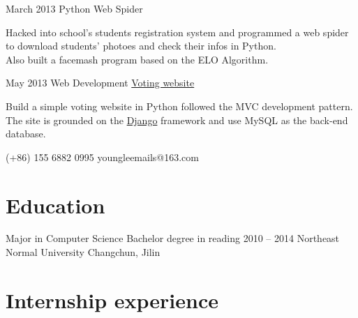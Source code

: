 \documentclass{tccv}
\begin{document}
\begin{eventlist}
\item{March 2013}
  {}
  {Python Web Spider}

  Hacked into school's students registration system
  and programmed a web spider to download students' photoes and check their infos in Python. \\ 
  Also built a facemash program based on the ELO Algorithm.


\item{May 2013}
  {Web Development}
  {\href{https://github.com/YoungLeeNENU/a-vote-website}{Voting website}}

  Build a simple voting website in Python followed the MVC development pattern. \\ 
  The site is grounded on the \href{https://www.djangoproject.com/}{Django} framework
  and use MySQL as the back-end database.


\end{eventlist}

{(+86) 155 6882 0995}
{youngleemails@163.com}


\section{Education}

\begin{yearlist}

\item[Major in Computer Science \newline
  Bachelor degree in reading]
  {2010 -- 2014}
  {Northeast Normal University}
  {Changchun, Jilin}

\end{yearlist}

\section{Internship experience}    %
\end{document}
